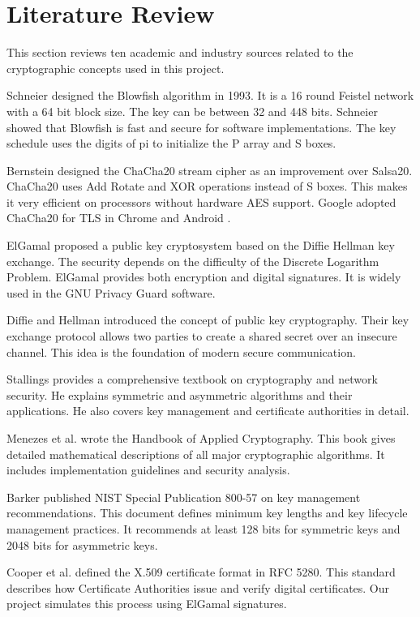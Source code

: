 \documentclass[12pt,a4paper]{article}
\begin{document}
\section{Literature Review}

This section reviews ten academic and industry sources related to the cryptographic concepts used in this project.

Schneier \cite{schneier1994} designed the Blowfish algorithm in 1993. It is a 16 round Feistel network with a 64 bit block size. The key can be between 32 and 448 bits. Schneier showed that Blowfish is fast and secure for software implementations. The key schedule uses the digits of pi to initialize the P array and S boxes.

Bernstein \cite{bernstein2008} designed the ChaCha20 stream cipher as an improvement over Salsa20. ChaCha20 uses Add Rotate and XOR operations instead of S boxes. This makes it very efficient on processors without hardware AES support. Google adopted ChaCha20 for TLS in Chrome and Android \cite{langley2015}.

ElGamal \cite{elgamal1985} proposed a public key cryptosystem based on the Diffie Hellman key exchange. The security depends on the difficulty of the Discrete Logarithm Problem. ElGamal provides both encryption and digital signatures. It is widely used in the GNU Privacy Guard software.

Diffie and Hellman \cite{diffie1976} introduced the concept of public key cryptography. Their key exchange protocol allows two parties to create a shared secret over an insecure channel. This idea is the foundation of modern secure communication.

Stallings \cite{stallings2017} provides a comprehensive textbook on cryptography and network security. He explains symmetric and asymmetric algorithms and their applications. He also covers key management and certificate authorities in detail.

Menezes et al. \cite{menezes1996} wrote the Handbook of Applied Cryptography. This book gives detailed mathematical descriptions of all major cryptographic algorithms. It includes implementation guidelines and security analysis.

Barker \cite{barker2020} published NIST Special Publication 800-57 on key management recommendations. This document defines minimum key lengths and key lifecycle management practices. It recommends at least 128 bits for symmetric keys and 2048 bits for asymmetric keys.

Cooper et al. \cite{cooper2008} defined the X.509 certificate format in RFC 5280. This standard describes how Certificate Authorities issue and verify digital certificates. Our project simulates this process using ElGamal signatures.
\end{document}
